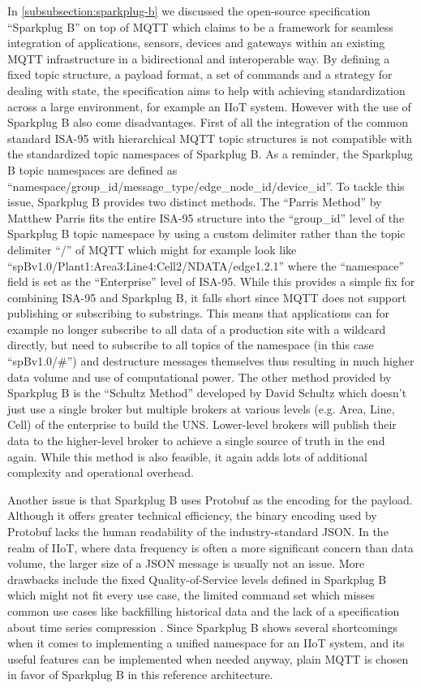    In \autoref{subsubsection:sparkplug-b} we discussed the open-source specification ``Sparkplug B'' on top of MQTT which claims to be a framework for seamless integration of applications, sensors, devices and gateways within an existing MQTT infrastructure in a bidirectional and interoperable way. By defining a fixed topic structure, a payload format, a set of commands and a strategy for dealing with state, the specification aims to help with achieving standardization across a large environment, for example an IIoT system. However with the use of Sparkplug B also come disadvantages. First of all the integration of the common standard ISA-95 with hierarchical MQTT topic structures is not compatible with the standardized topic namespaces of Sparkplug B. As a reminder, the Sparkplug B topic namespaces are defined as ``namespace/group\_id/message\_type/edge\_node\_id/device\_id''. To tackle this issue, Sparkplug B provides two distinct methods. The ``Parris Method'' by Matthew Parris fits the entire ISA-95 structure into the ``group\_id'' level of the Sparkplug B topic namespace by using a custom delimiter rather than the topic delimiter ``/'' of MQTT which might for example look like ``spBv1.0/Plant1:Area3:Line4:Cell2/NDATA/edge1.2.1'' where the ``namespace'' field is set as the ``Enterprise'' level of ISA-95. While this provides a simple fix for combining ISA-95 and Sparkplug B, it falls short since MQTT does not support publishing or subscribing to substrings. This means that applications can for example no longer subscribe to all data of a production site with a wildcard directly, but need to subscribe to all topics of the namespace (in this case ``spBv1.0/\#'') and destructure messages themselves thus resulting in much higher data volume and use of computational power. The other method provided by Sparkplug B is the ``Schultz Method'' developed by David Schultz which doesn't just use a single broker but multiple brokers at various levels (e.g. Area, Line, Cell) of the enterprise to build the UNS. Lower-level brokers will publish their data to the higher-level broker to achieve a single source of truth in the end again. While this method is also feasible, it again adds lots of additional complexity and operational overhead. 
    
    Another issue is that Sparkplug B uses Protobuf as the encoding for the payload. Although it offers greater technical efficiency, the binary encoding used by Protobuf lacks the human readability of the industry-standard JSON. In the realm of IIoT, where data frequency is often a more significant concern than data volume, the larger size of a JSON message is usually not an issue. More drawbacks include the fixed Quality-of-Service levels defined in Sparkplug B which might not fit every use case, the limited command set which misses common use cases like backfilling historical data and the lack of a specification about time series compression \cite{building_iiot, hivemq_essentials_uns, does_mqtt_uns_solve}. Since Sparkplug B shows several shortcomings when it comes to implementing a unified namespace for an IIoT system, and its useful features can be implemented when needed anyway, plain MQTT is chosen in favor of Sparkplug B in this reference architecture.

